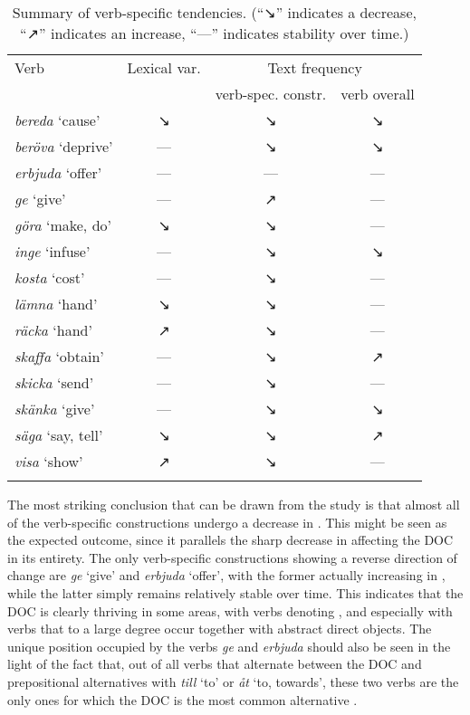 \documentclass[output=paper]{langscibook}
\begin{document}
\begin{table}
\begin{tabular}{lccc}
\lsptoprule
Verb & Lexical var. & \multicolumn{2}{c}{Text frequency}\\\cmidrule(lr){3-4} 
     & & verb-spec. constr. & verb overall\\\midrule
\textit{bereda} ‘cause’ & ↘ & ↘ & ↘\\
\textit{beröva} ‘deprive’ & --- & ↘ & ↘\\
\textit{erbjuda} ‘offer’ & --- & --- & ---\\
\textit{ge} ‘give’ & --- & ↗ & ---\\
\textit{göra} ‘make, do’ & ↘ & ↘ & ---\\
\textit{inge} ‘infuse’ & --- & ↘ & ↘\\
\textit{kosta} ‘cost’ & --- & ↘ & ---\\
\textit{lämna} ‘hand’ & ↘ & ↘ & ---\\
\textit{räcka} ‘hand’ & ↗ & ↘ & ---\\
\textit{skaffa} ‘obtain’ &  --- & ↘ & ↗\\
\textit{skicka} ‘send’ & --- & ↘ & ---\\
\textit{skänka} ‘give’ & --- & ↘ & ↘\\
\textit{säga} ‘say, tell’ & ↘ & ↘ & ↗\\
\textit{visa} ‘show’ & ↗ & ↘ & ---\\
\lspbottomrule
\end{tabular}
\caption{Summary of verb-specific tendencies. (``↘'' indicates a decrease, ``↗'' indicates an increase, ``---'' indicates stability over time.)\label{fig:valdeson:3}}
\end{table}


The most striking conclusion that can be drawn from the study is that almost all of the verb-specific constructions undergo a decrease in . This might be seen as the expected outcome, since it parallels the sharp decrease in  affecting the DOC in its entirety. The only verb-specific constructions showing a reverse direction of change are \textit{ge} ‘give’ and \textit{erbjuda} ‘offer’, with the former actually increasing in , while the latter simply remains relatively stable over time. This indicates that the DOC is clearly thriving in some areas, with verbs denoting , and especially with verbs that to a large degree occur together with abstract direct objects. The unique position occupied by the verbs \textit{ge} and \textit{erbjuda} should also be seen in the light of the fact that, out of all verbs that alternate between the DOC and prepositional alternatives with \textit{till} ‘to’ or \textit{åt} ‘to, towards’, these two verbs are the only ones for which the DOC is the most common alternative \citep{Valdeson2017}.
\end{document}
